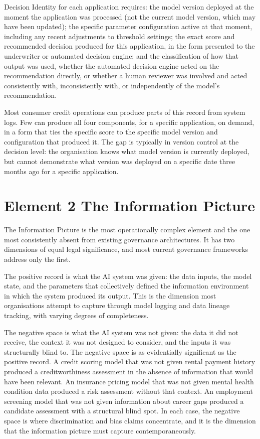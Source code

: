 Decision Identity for each application requires: the model version deployed at the moment the application was processed (not the current model version, which may have been updated); the specific parameter configuration active at that moment, including any recent adjustments to threshold settings; the exact score and recommended decision produced for this application, in the form presented to the underwriter or automated decision engine; and the classification of how that output was used, whether the automated decision engine acted on the recommendation directly, or whether a human reviewer was involved and acted consistently with, inconsistently with, or independently of the model's recommendation.

Most consumer credit operations can produce parts of this record from system logs. Few can produce all four components, for a specific application, on demand, in a form that ties the specific score to the specific model version and configuration that produced it. The gap is typically in version control at the decision level: the organisation knows what model version is currently deployed, but cannot demonstrate what version was deployed on a specific date three months ago for a specific application.

\scenebreak

\section{Element 2 The Information Picture}

The Information Picture is the most operationally complex element and the one most consistently absent from existing governance architectures. It has two dimensions of equal legal significance, and most current governance frameworks address only the first.

The positive record is what the AI system was given: the data inputs, the model state, and the parameters that collectively defined the information environment in which the system produced its output. This is the dimension most organisations attempt to capture through model logging and data lineage tracking, with varying degrees of completeness.

The negative space is what the AI system was not given: the data it did not receive, the context it was not designed to consider, and the inputs it was structurally blind to. The negative space is as evidentially significant as the positive record. A credit scoring model that was not given rental payment history produced a creditworthiness assessment in the absence of information that would have been relevant. An insurance pricing model that was not given mental health condition data produced a risk assessment without that context. An employment screening model that was not given information about career gaps produced a candidate assessment with a structural blind spot. In each case, the negative space is where discrimination and bias claims concentrate, and it is the dimension that the information picture must capture contemporaneously.

